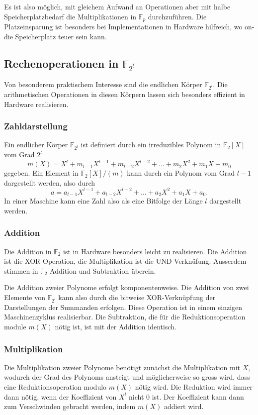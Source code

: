 Es ist also möglich, mit gleichem Aufwand an Operationen
aber mit halbe Speicherplatzbedarf die Multiplikationen in $\mathbb{F}_p$
durchzuführen.
Die Platzeinsparung ist besonders bei Implementationen in Hardware 
hilfreich, wo on-die Speicherplatz teuer sein kann.

\subsection{Rechenoperationen in $\mathbb{F}_{2^l}$
\label{buch:subsection:rechenoperatione-in-f2l}}
Von besonderem praktischem Interesse sind die endlichen Körper
$\mathbb{F}_{2^l}$.
Die arithmetischen Operationen in diesen Körpern lassen sich besonders
effizient in Hardware realisieren.

\subsubsection{Zahldarstellung}
Ein endlicher Körper $\mathbb{F}_{2^l}$ ist definiert durch ein
irreduzibles Polynom in $\mathbb{F}_2[X]$ vom Grad $2^l$ 
\[
m(X)
=
X^l + m_{l-1}X^{l-1} + m_{l-2}X^{l-2} + \dots + m_2X^2 + m_1X + m_0
\]
gegeben.
Ein Element in $\mathbb{F}_2[X]/(m)$ kann
durch ein Polynom vom Grad $l-1$
dargestellt werden, also durch
\[
a = a_{l-1}X^{l-1} + a_{l-2}X^{l-2} +\dots + a_2X^2 + a_1X + a_0.
\]
In einer Maschine kann eine Zahl also als eine Bitfolge der Länge $l$
dargestellt werden.

\subsubsection{Addition}
Die Addition in $\mathbb{F}_2$ ist in Hardware besonders leicht zu
realisieren.
Die Addition ist die XOR-Operation, die Multiplikation ist die UND-Verknüfung.
Ausserdem stimmen in $\mathbb{F}_2$ Addition und Subtraktion überein.

Die Addition zweier Polynome erfolgt komponentenweise.
Die Addition von zwei Elemente von $\mathbb{F}_{2^l}$ kann also
durch die bitweise XOR-Verknüpfung der Darstellungen der Summanden 
erfolgen.
Diese Operation ist in einem einzigen Maschinenzyklus realisierbar.
Die Subtraktion, die für die Reduktionsoperation module $m(X)$ nötig
ist, ist mit der Addition identisch.

\subsubsection{Multiplikation}
Die Multiplikation zweier Polynome benötigt zunächst die Multiplikation
mit $X$, wodurch der Grad des Polynoms ansteigt und möglicherweise so
gross wird, dass eine Reduktionsoperation modulo $m(X)$ nötig wird.
Die Reduktion wird immer dann nötig, wenn der Koeffizient von $X^l$
nicht $0$ ist.
Der Koeffizient kann dann zum Verschwinden gebracht werden, indem
$m(X)$ addiert wird.

